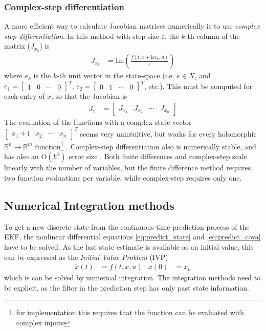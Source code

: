 \subsubsection{Complex-step differentiation}
A more efficient way to calculate Jacobian matrices numerically is to use \textit{complex step differentiation}.
In this method with step size $\varepsilon$, the $k$-th column of the matrix ($J_{x_k}$) is \cite{martins2003}
\begin{align}
    J_{x_k} &= \mathrm{Im} \left( \frac{f(t, x + \mathrm{i} \varepsilon e_k, u)}{\varepsilon} \right)
    \label{eq:appendix_jacobian_complex_step}
\end{align}
where $e_k$ is the $k$-th unit vector in the state-space (i.e. $e \in X$, and $e_1 = [\begin{smallmatrix} 1 & 0 & \cdots & 0 \end{smallmatrix}]^T$, $e_2 = [\begin{smallmatrix} 0 & 1 & \cdots & 0 \end{smallmatrix}]^T$, etc.).
This must be computed for each entry of $x$, so that the Jacobian is 
\begin{align}
    J_x &= \begin{bmatrix}
        J_{x_1} & J_{x_2} & \cdots & J_{x_n} 
    \end{bmatrix} 
\end{align}
The evaluation of the functions with a complex state vector $[\begin{smallmatrix} x_1 + \mathrm{i} & x_2 & \cdots & x_n \end{smallmatrix}]^T$ seems very unintuitive, but works for every holomorphic $\mathbb{R}^n \rightarrow \mathbb{R}^m$ function\footnote{for implementation this requires that the function can be evaluated with complex inputs} \cite{martins2021}.
Complex-step differentiation also is numerically stable, and has also an $\mathrm{O}(h^2)$ error size \cite{martins2003}. 
Both finite differences and complex-step scale linearly with the number of variables, but the finite difference method requires two function evaluations per variable, while complex-step requires only one.


\subsection{Numerical Integration methods}
To get a new discrete state from the continuous-time prediction process of the EKF, the nonlinear differential equations \ref{eq:predict_state} and \ref{eq:predict_cova} have to be solved.
As the last state estimate is available as an initial value, this can be expressed as the \textit{Initial Value Problem} (IVP)
\begin{align}
    \dot x(t) &= f(t, x, u) & x(0) &= x_{n} 
\end{align}
which is can be solved by numerical integration. 
The integration methods need to be explicit, as the filter in the prediction step has only past state information. 

